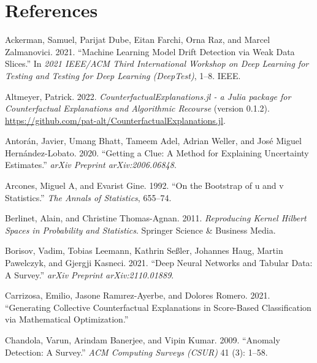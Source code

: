 \documentclass[conference,final,]{IEEEtran}
\newlength{\cslhangindent}
\newlength{\cslentryspacingunit} %
\newenvironment{CSLReferences}[2] %
 {%
  \setlength{\parindent}{0pt}
  \ifodd #1
  \let\oldpar\par
  \def\par{\hangindent=\cslhangindent\oldpar}
  \fi
  \setlength{\parskip}{#2\cslentryspacingunit}
 }%
 {}
\begin{document}
\hypertarget{references}{%
\section*{References}\label{references}}

\hypertarget{refs}{}
\begin{CSLReferences}{1}{0}
\leavevmode{}%
Ackerman, Samuel, Parijat Dube, Eitan Farchi, Orna Raz, and Marcel Zalmanovici. 2021. {``Machine Learning Model Drift Detection via Weak Data Slices.''} In \emph{2021 IEEE/ACM Third International Workshop on Deep Learning for Testing and Testing for Deep Learning (DeepTest)}, 1--8. IEEE.

\leavevmode{}%
Altmeyer, Patrick. 2022. \emph{{CounterfactualExplanations.jl - a Julia package for Counterfactual Explanations and Algorithmic Recourse}} (version 0.1.2). \url{https://github.com/pat-alt/CounterfactualExplanations.jl}.

\leavevmode{}%
Antorán, Javier, Umang Bhatt, Tameem Adel, Adrian Weller, and José Miguel Hernández-Lobato. 2020. {``Getting a Clue: A Method for Explaining Uncertainty Estimates.''} \emph{arXiv Preprint arXiv:2006.06848}.

\leavevmode{}%
Arcones, Miguel A, and Evarist Gine. 1992. {``On the Bootstrap of u and v Statistics.''} \emph{The Annals of Statistics}, 655--74.

\leavevmode{}%
Berlinet, Alain, and Christine Thomas-Agnan. 2011. \emph{Reproducing Kernel Hilbert Spaces in Probability and Statistics}. Springer Science \& Business Media.

\leavevmode{}%
Borisov, Vadim, Tobias Leemann, Kathrin Seßler, Johannes Haug, Martin Pawelczyk, and Gjergji Kasneci. 2021. {``Deep Neural Networks and Tabular Data: A Survey.''} \emph{arXiv Preprint arXiv:2110.01889}.

\leavevmode{}%
Carrizosa, Emilio, Jasone Ramırez-Ayerbe, and Dolores Romero. 2021. {``Generating Collective Counterfactual Explanations in Score-Based Classification via Mathematical Optimization.''}

\leavevmode{}%
Chandola, Varun, Arindam Banerjee, and Vipin Kumar. 2009. {``Anomaly Detection: A Survey.''} \emph{ACM Computing Surveys (CSUR)} 41 (3): 1--58.


\end{CSLReferences}
\end{document}
